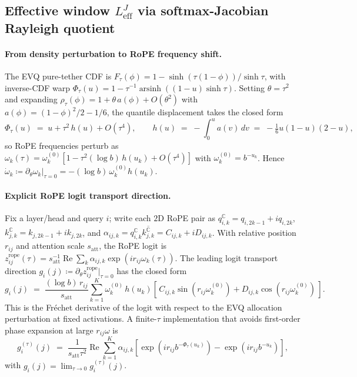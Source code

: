 \subsection{Effective window \texorpdfstring{$L_{\mathrm{eff}}^{J}$}{L\_eff\^J} via softmax-Jacobian Rayleigh quotient}
\label{sec:leff-derivation}

\paragraph{From density perturbation to RoPE frequency shift.}
The EVQ pure-tether CDF is $F_\tau(\phi) = 1 - \sinh(\tau(1{-}\phi))/\sinh\tau$, with inverse-CDF warp $\Phi_\tau(u) = 1 - \tau^{-1}\operatorname{arsinh}((1{-}u)\sinh\tau)$. Setting $\theta{=}\tau^2$ and expanding $\rho_\tau(\phi) = 1 + \theta\, a(\phi) + O(\theta^2)$ with $a(\phi) = (1{-}\phi)^2/2 - 1/6$, the quantile displacement takes the closed form
\begin{equation}
\Phi_\tau(u) \;=\; u + \tau^2\, h(u) + O(\tau^4), \qquad h(u) \;=\; -\!\int_0^u a(v)\,dv \;=\; -\tfrac{1}{6}u(1{-}u)(2{-}u),
\label{eq:quantile-displacement}
\end{equation}
so RoPE frequencies perturb as $\omega_k(\tau) = \omega_k^{(0)}[1 - \tau^2(\log b)\,h(u_k) + O(\tau^4)]$ with $\omega_k^{(0)}{=}b^{-u_k}$. Hence $\dot\omega_k \coloneqq \partial_{\theta}\omega_k|_{\tau=0} = -(\log b)\,\omega_k^{(0)} h(u_k)$.

\paragraph{Explicit RoPE logit transport direction.}
Fix a layer/head and query $i$; write each $2$D RoPE pair as $q_{i,k}^{\mathbb{C}} = q_{i,2k{-}1}{+}iq_{i,2k}$, $k_{j,k}^{\mathbb{C}} = k_{j,2k{-}1}{+}ik_{j,2k}$, and $\alpha_{ij,k} = q_{i,k}^{\mathbb{C}}\overline{k_{j,k}^{\mathbb{C}}} = C_{ij,k} + iD_{ij,k}$. With relative position $r_{ij}$ and attention scale $s_{\mathrm{att}}$, the RoPE logit is $z_{ij}^{\mathrm{rope}}(\tau) = s_{\mathrm{att}}^{-1}\operatorname{Re}\sum_{k}\alpha_{ij,k}\exp(i r_{ij}\omega_k(\tau))$. The leading logit transport direction $g_i(j) \coloneqq \partial_\theta z_{ij}^{\mathrm{rope}}|_{\tau=0}$ has the closed form
\begin{equation}
g_i(j) \;=\; \frac{(\log b)\,r_{ij}}{s_{\mathrm{att}}}\sum_{k=1}^{K} \omega_k^{(0)}\,h(u_k)\!\left[\,C_{ij,k}\sin(r_{ij}\omega_k^{(0)}) + D_{ij,k}\cos(r_{ij}\omega_k^{(0)})\,\right].
\label{eq:g-closed-form}
\end{equation}
This is the Fr\'echet derivative of the logit with respect to the EVQ allocation perturbation at fixed activations. A finite-$\tau$ implementation that avoids first-order phase expansion at large $r_{ij}\omega$ is
\begin{equation}
g_i^{(\tau)}(j) \;=\; \frac{1}{s_{\mathrm{att}}\tau^2}\operatorname{Re}\sum_{k=1}^{K}\alpha_{ij,k}\!\left[\exp(ir_{ij}b^{-\Phi_\tau(u_k)}) - \exp(ir_{ij}b^{-u_k})\right],
\label{eq:g-finite-tau}
\end{equation}
with $g_i(j) = \lim_{\tau\to 0} g_i^{(\tau)}(j)$.

